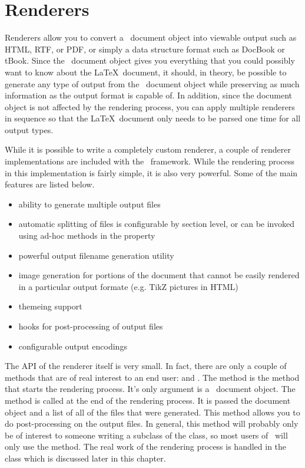 \chapter{Renderers}

Renderers allow you to convert a \plasTeX\ document object into viewable
output such as HTML, RTF, or PDF, or simply a data structure format such
as DocBook or tBook.  Since the \plasTeX\ document object gives you
everything that you could possibly want to know about the \LaTeX\ document,
it should, in theory, be possible to generate any type of output from
the \plasTeX\ document object while preserving as much information as the
output format is capable of.  In addition, since the document object is
not affected by the rendering process, you can apply multiple renderers
in sequence so that the \LaTeX\ document only needs to be parsed one time
for all output types.

While it is possible to write a completely custom renderer, a couple of
renderer implementations are included with the \plasTeX\ framework.
While the rendering process in this implementation is fairly simple,
it is also very powerful.  Some of the main features are listed below.
\begin{itemize}
\item ability to generate multiple output files
\item automatic splitting of files is configurable by section level,
    or can be invoked using ad-hoc methods in the
     property
\item powerful output filename generation utility
\item image generation for portions of the document that cannot be
    easily rendered in a particular output formate (e.g. TikZ pictures in HTML)
\item themeing support
\item hooks for post-processing of output files
\item configurable output encodings
\end{itemize}

The API of the renderer itself is very small.  In fact, there are only
a couple of methods that are of real interest to an end user: 
and .  The  method is the method that starts
the rendering process.  It's only argument is a \plasTeX\ document object.
The  method is called at the end of the rendering process.
It is passed the document object and a list of all of the files that were
generated.  This method allows you to do post-processing on the output files.
In general, this method will probably only be of interest to someone
writing a subclass of the  class, so most users of
\plasTeX\ will only use the  method.  The real work of
the rendering process is handled in the  class which
is discussed later in this chapter.

